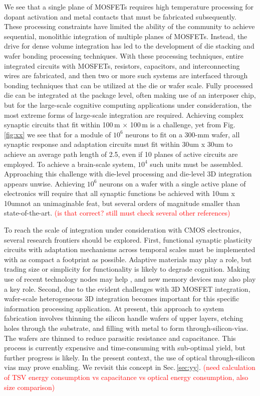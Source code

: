 \documentclass[twocolumn]{article}
\begin{document}
We see that a single plane of MOSFETs requires high temperature processing for dopant activation and metal contacts that must be fabricated subsequently. These processing constraints have limited the ability of the community to achieve sequential, monolithic integration of multiple planes of MOSFETs. Instead, the drive for dense volume integration has led to the development of die stacking \cite{} and wafer bonding \cite{} processing techniques. With these processing techniques, entire integrated circuits with MOSFETs, resistors, capacitors, and interconnecting wires are fabricated, and then two or more such systems are interfaced through bonding techniques that can be utilized at the die or wafer scale. Fully processed die can be integrated at the package level, often making use of an interposer chip, but for the large-scale cognitive computing applications under consideration, the most extreme forms of large-scale integration are required. Achieving complex synaptic circuits that fit within 100\,\textmu m $\times$ 100\,\textmu m is a challenge, yet from Fig.\,\ref{fig:xx} we see that for a module of $10^6$ neurons to fit on a 300-mm wafer, all synaptic response and adaptation circuits must fit within 30um x 30um to achieve an average path length of 2.5, even if 10 planes of active circuits are employed. To achieve a brain-scale system, $10^4$ such units must be assembled. Approaching this challenge with die-level processing and die-level 3D integration appears unwise. Achieving $10^6$ neurons on a wafer with a single active plane of electronics will require that all synaptic functions be achieved with 10um x 10um\textemdash not an unimaginable feat, but several orders of magnitude smaller than state-of-the-art. \textcolor{red}{(is that correct? still must check several other references)}

To reach the scale of integration under consideration with CMOS electronics, several research frontiers should be explored. First, functional synaptic plasticity circuits with adaptation mechanisms across temporal scales must be implemented with as compact a footprint as possible. Adaptive materials may play a role, but trading size or simplicity for functionality is likely to degrade cognition. Making use of recent technology nodes may help \cite{}, and new memory devices may also play a key role. Second, due to the evident challenges with 3D MOSFET integration, wafer-scale heterogeneous 3D integration becomes important for this specific information processing application. At present, this approach to system fabrication involves thinning the silicon handle wafers of upper layers, etching holes through the substrate, and filling with metal to form through-silicon-vias. The wafers are thinned to reduce parasitic resistance and capacitance. This process is currently expensive and time-consuming with sub-optimal yield, but further progress is likely. In the present context, the use of optical through-silicon vias may prove enabling. We revisit this concept in Sec.\,\ref{sec:yy}. \textcolor{red}{(need calculation of TSV energy consumption vs capacitance vs optical energy consumption, also size comparison)}
\end{document}
